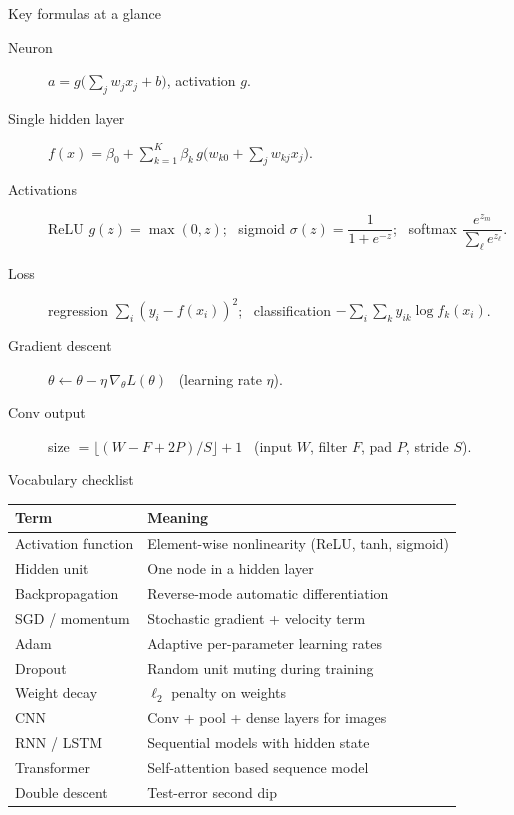 \documentclass[aspectratio=169,11pt]{beamer}
\begin{document}
\begin{frame}{Key formulas at a glance}
  \footnotesize
  \begin{description}
    \item[Neuron] $a=g\!\big(\textstyle\sum_j w_j x_j+b\big)$, activation $g$.
    \item[Single hidden layer] $f(x)=\beta_0+\sum_{k=1}^{K}\beta_k\,g\!\big(w_{k0}+\sum_j w_{kj}x_j\big)$.
    \item[Activations] ReLU $g(z)=\max(0,z)$; \ sigmoid $\sigma(z)=\dfrac{1}{1+e^{-z}}$; \ softmax $\dfrac{e^{z_m}}{\sum_\ell e^{z_\ell}}$.
    \item[Loss] regression $\sum_i(y_i-f(x_i))^2$; \ classification $-\sum_i\sum_k y_{ik}\log f_k(x_i)$.
    \item[Gradient descent] $\theta \leftarrow \theta-\eta\,\nabla_\theta L(\theta)$ \ (learning rate $\eta$).
    \item[Conv output] size $=\big\lfloor (W-F+2P)/S\big\rfloor+1$ \ (input $W$, filter $F$, pad $P$, stride $S$).
  \end{description}
\end{frame}

\begin{frame}{Vocabulary checklist}
  \footnotesize
  \begin{tabular}{ll}
    \toprule
    \textbf{Term} & \textbf{Meaning} \\
    \midrule
    Activation function & Element-wise nonlinearity (ReLU, tanh, sigmoid) \\
    Hidden unit & One node in a hidden layer \\
    Backpropagation & Reverse-mode automatic differentiation \\
    SGD / momentum & Stochastic gradient + velocity term \\
    Adam & Adaptive per-parameter learning rates \\
    Dropout & Random unit muting during training \\
    Weight decay & $\ell_2$ penalty on weights \\
    CNN & Conv + pool + dense layers for images \\
    RNN / LSTM & Sequential models with hidden state \\
    Transformer & Self-attention based sequence model \\
    Double descent & Test-error second dip \\
    \bottomrule
  \end{tabular}
\end{frame}
\end{document}

